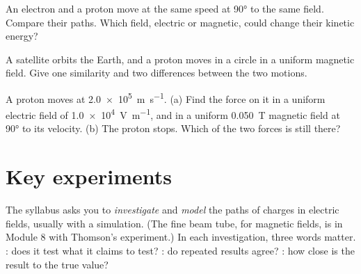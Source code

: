 \begin{quickcheck}
  \item An electron and a proton move at the same speed at \ang{90} to the same
        field. Compare their paths. Which field, electric or magnetic, could
        change their kinetic energy?
  \item A satellite orbits the Earth, and a proton moves in a circle in a
        uniform magnetic field. Give one similarity and two differences
        between the two motions.
  \item A proton moves at \qty{2.0e5}{m.s^{-1}}. (a) Find the force on it in a
        uniform electric field of \qty{1.0e4}{V.m^{-1}}, and in a uniform
        \qty{0.050}{T} magnetic field at \ang{90} to its velocity. (b) The
        proton stops. Which of the two forces is still there?
\end{quickcheck}

\section{Key experiments}\label{ch1:sec:experiments}

The syllabus asks you to \emph{investigate} and \emph{model} the paths of
charges in electric fields, usually with a simulation. (The fine beam tube, for
magnetic fields, is in Module 8 with Thomson's experiment.) In each
investigation, three words matter. : does it test what it claims
to test? : do repeated results agree? : how
close is the result to the true value?

